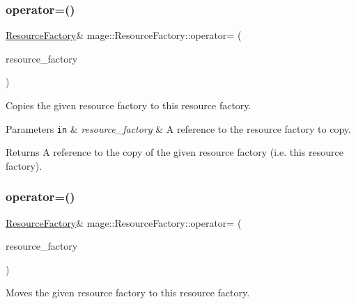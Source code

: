 \subsubsection{\texorpdfstring{operator=()}{operator=()}\hspace{0.1cm}{\footnotesize\ttfamily [1/2]}}
{\footnotesize\ttfamily \hyperlink{classmage_1_1_resource_factory}{Resource\+Factory}\& mage\+::\+Resource\+Factory\+::operator= (\begin{DoxyParamCaption}\item[{const \hyperlink{classmage_1_1_resource_factory}{Resource\+Factory} \&}]{resource\+\_\+factory }\end{DoxyParamCaption})\hspace{0.3cm}{\ttfamily [delete]}}

Copies the given resource factory to this resource factory.


\begin{DoxyParams}[1]{Parameters}
\mbox{\tt in}  & {\em resource\+\_\+factory} & A reference to the resource factory to copy. \\
\hline
\end{DoxyParams}
\begin{DoxyReturn}{Returns}
A reference to the copy of the given resource factory (i.\+e. this resource factory). 
\end{DoxyReturn}
\hypertarget{classmage_1_1_resource_factory_a4a1a0c064f068329f4b94c47ec17046f}{}\label{classmage_1_1_resource_factory_a4a1a0c064f068329f4b94c47ec17046f} 
\subsubsection{\texorpdfstring{operator=()}{operator=()}\hspace{0.1cm}{\footnotesize\ttfamily [2/2]}}
{\footnotesize\ttfamily \hyperlink{classmage_1_1_resource_factory}{Resource\+Factory}\& mage\+::\+Resource\+Factory\+::operator= (\begin{DoxyParamCaption}\item[{\hyperlink{classmage_1_1_resource_factory}{Resource\+Factory} \&\&}]{resource\+\_\+factory }\end{DoxyParamCaption})\hspace{0.3cm}{\ttfamily [delete]}}

Moves the given resource factory to this resource factory.


